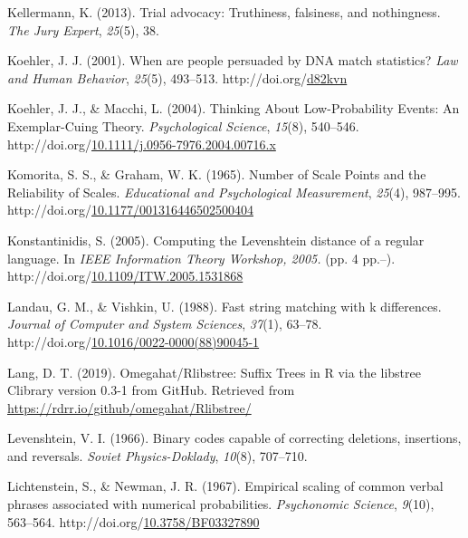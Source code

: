 \documentclass[print]{nuthesis}
\newlength{\cslhangindent}
\newenvironment{CSLReferences}[2]%
{\setlength{\parindent}{0pt}%
\everypar{\setlength{\hangindent}{\cslhangindent}}\ignorespaces}%
{\par}
\begin{document}
\begin{CSLReferences}{1}{0}
\leavevmode{}%
Kellermann, K. (2013). Trial advocacy: {Truthiness}, falsiness, and nothingness. \emph{The Jury Expert}, \emph{25}(5), 38.

\leavevmode{}%
Koehler, J. J. (2001). When are people persuaded by {DNA} match statistics? \emph{Law and Human Behavior}, \emph{25}(5), 493--513. http://doi.org/\href{https://doi.org/d82kvn}{d82kvn}

\leavevmode{}%
Koehler, J. J., \& Macchi, L. (2004). Thinking {About} {Low}-{Probability} {Events}: {An} {Exemplar}-{Cuing} {Theory}. \emph{Psychological Science}, \emph{15}(8), 540--546. http://doi.org/\href{https://doi.org/10.1111/j.0956-7976.2004.00716.x}{10.1111/j.0956-7976.2004.00716.x}

\leavevmode{}%
Komorita, S. S., \& Graham, W. K. (1965). Number of {Scale} {Points} and the {Reliability} of {Scales}. \emph{Educational and Psychological Measurement}, \emph{25}(4), 987--995. http://doi.org/\href{https://doi.org/10.1177/001316446502500404}{10.1177/001316446502500404}

\leavevmode{}%
Konstantinidis, S. (2005). Computing the {Levenshtein} distance of a regular language. In \emph{{IEEE} {Information} {Theory} {Workshop}, 2005.} (pp. 4 pp.--). http://doi.org/\href{https://doi.org/10.1109/ITW.2005.1531868}{10.1109/ITW.2005.1531868}

\leavevmode{}%
Landau, G. M., \& Vishkin, U. (1988). Fast string matching with k differences. \emph{Journal of Computer and System Sciences}, \emph{37}(1), 63--78. http://doi.org/\href{https://doi.org/10.1016/0022-0000(88)90045-1}{10.1016/0022-0000(88)90045-1}

\leavevmode{}%
Lang, D. T. (2019). Omegahat/{Rlibstree}: {Suffix} {Trees} in {R} via the libstree {Clibrary} version 0.3-1 from {GitHub}. Retrieved from \url{https://rdrr.io/github/omegahat/Rlibstree/}

\leavevmode{}%
Levenshtein, V. I. (1966). Binary codes capable of correcting deletions, insertions, and reversals. \emph{Soviet Physics-Doklady}, \emph{10}(8), 707--710.

\leavevmode{}%
Lichtenstein, S., \& Newman, J. R. (1967). Empirical scaling of common verbal phrases associated with numerical probabilities. \emph{Psychonomic Science}, \emph{9}(10), 563--564. http://doi.org/\href{https://doi.org/10.3758/BF03327890}{10.3758/BF03327890}


\end{CSLReferences}
\end{document}
